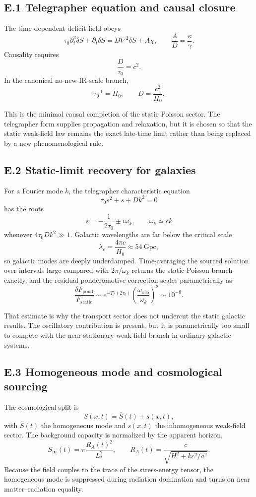 \documentclass[11pt]{article}
\begin{document}
\subsection*{E.1 Telegrapher equation and causal closure}

The time-dependent deficit field obeys
\[
\tau_0\partial_t^2\delta S+\partial_t\delta S=D\nabla^2\delta S+A\chi,
\qquad
\frac{A}{D}=\frac{\kappa}{\gamma}.
\]
Causality requires
\[
\frac{D}{\tau_0}=c^2.
\]
In the canonical no-new-IR-scale branch,
\[
\tau_0^{-1}=H_0,
\qquad
D=\frac{c^2}{H_0}.
\]

This is the minimal causal completion of the static Poisson sector. The telegrapher form supplies propagation and relaxation, but it is chosen so that the static weak-field law remains the exact late-time limit rather than being replaced by a new phenomenological rule.

\subsection*{E.2 Static-limit recovery for galaxies}

For a Fourier mode $k$, the telegrapher characteristic equation
\[
\tau_0 s^2+s+Dk^2=0
\]
has the roots
\[
s=-\frac{1}{2\tau_0}\pm i\omega_k,
\qquad
\omega_k\simeq ck
\]
whenever $4\tau_0Dk^2\gg 1$. Galactic wavelengths are far below the critical scale
\[
\lambda_c=\frac{4\pi c}{H_0}\approx 54\ \mathrm{Gpc},
\]
so galactic modes are deeply underdamped. Time-averaging the sourced solution over intervals large compared with $2\pi/\omega_k$ returns the static Poisson branch exactly, and the residual ponderomotive correction scales parametrically as
\[
\frac{\delta F_{\mathrm{pond}}}{F_{\mathrm{static}}}
\sim
e^{-T/(2\tau_0)}
\left(\frac{\omega_{\mathrm{orb}}}{\omega_k}\right)^2
\sim 10^{-8}.
\]

That estimate is why the transport sector does not undercut the static galactic results. The oscillatory contribution is present, but it is parametrically too small to compete with the near-stationary weak-field branch in ordinary galactic systems.

\subsection*{E.3 Homogeneous mode and cosmological sourcing}

The cosmological split is
\[
S(x,t)=\overline S(t)+s(x,t),
\]
with $\overline S(t)$ the homogeneous mode and $s(x,t)$ the inhomogeneous weak-field sector. The background capacity is normalized by the apparent horizon,
\[
S_\infty(t)=\pi\frac{R_A(t)^2}{L_*^2},
\qquad
R_A(t)=\frac{c}{\sqrt{H^2+k c^2/a^2}}.
\]
Because the field couples to the trace of the stress-energy tensor, the homogeneous mode is suppressed during radiation domination and turns on near matter--radiation equality.
\end{document}
